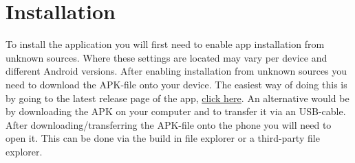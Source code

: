 \section{Installation}
To install the application you will first need to enable app installation from unknown sources. Where these settings are located may vary per device and different Android versions.\newline
\newline
After enabling installation from unknown sources you need to download the APK-file onto your device. The easiest way of doing this is by going to the latest release page of the app, \href{https://github.com/RescueOnWheels/Tincidunt/releases/latest}{click here}. An alternative would be by downloading the APK on your computer and to transfer it via an USB-cable.\newline
\newline
After downloading/transferring the APK-file onto the phone you will need to open it. This can be done via the build in file explorer or a third-party file explorer.

